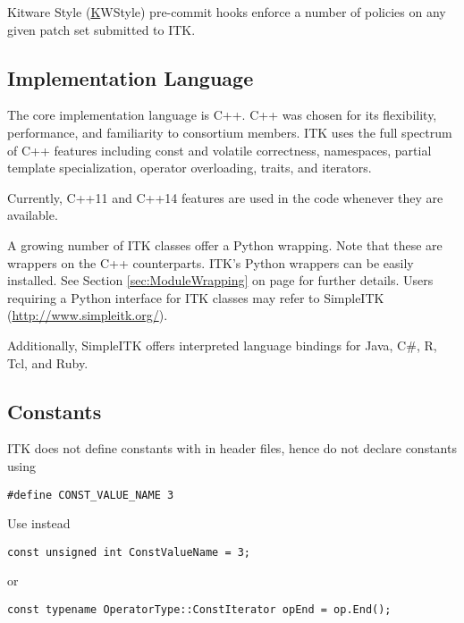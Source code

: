 Kitware Style (\href{https://kitware.github.io/KWStyle/} KWStyle) pre-commit
hooks enforce a number of policies on any given patch set submitted to ITK.


\subsection{Implementation Language}
\label{subsec:ImplementationLanguage}

The core implementation language is C++. C++ was chosen for its flexibility,
performance, and familiarity to consortium members. ITK uses the full spectrum
of C++ features including const and volatile correctness, namespaces, partial
template specialization, operator overloading, traits, and iterators.

Currently, C++11 and C++14 features are used in the code whenever they are
available.

A growing number of ITK classes offer a Python wrapping. Note that these are
wrappers on the C++ counterparts. ITK's Python wrappers can be easily installed.
See Section \ref{sec:ModuleWrapping} on page \pageref{sec:ModuleWrapping} for
further details. Users requiring a Python interface for ITK classes may refer to
SimpleITK (\href{http://www.simpleitk.org/}{http://www.simpleitk.org/}).

Additionally, SimpleITK offers interpreted language bindings for Java, C\#, R,
Tcl, and Ruby.


\subsection{Constants}
\label{subsec:Constants}

ITK does not define constants with  in header files, hence do not
declare constants using
\small
\begin{verbatim}
#define CONST_VALUE_NAME 3
\end{verbatim}
\normalsize

Use instead
\small
\begin{verbatim}
const unsigned int ConstValueName = 3;
\end{verbatim}
\normalsize
or
\small
\begin{verbatim}
const typename OperatorType::ConstIterator opEnd = op.End();
\end{verbatim}
\normalsize

